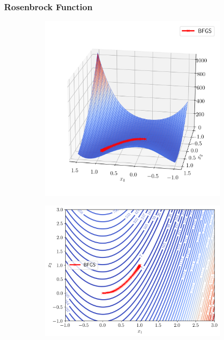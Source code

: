 \documentclass[12pt]{report}
\begin{document}
\subsubsection{Rosenbrock Function}
\begin{figure}[htpb]
	\centering
	\begin{subfigure}[t]{0.4\textwidth}
		\centering
		\includegraphics[width=\textwidth]{figs/rosenbrock_surface.png}
	\end{subfigure}
	\begin{subfigure}[t]{0.4\textwidth}
		\centering
		\includegraphics[width=\textwidth]{figs/rosenbrock_contour.png}

\end{subfigure}
\end{figure}
\end{document}
